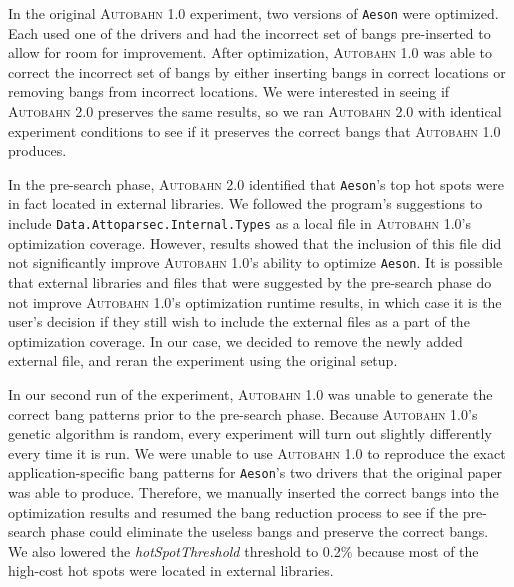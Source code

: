 \documentclass[format=sigplan, review=true]{acmart}
\newcommand{\hotspots}[0]{hot spots}
\newcommand{\hotspotcost}[0]{\textit{hotSpotThreshold}}
\newcommand{\Ao}[0]{\textsc{Autobahn 1.0}}
\newcommand{\At}[0]{\textsc{Autobahn 2.0}}
\newcommand{\preopt}[0]{pre-search}
\begin{document}
In the original \Ao{} experiment, two versions of \texttt{Aeson} were optimized. Each used one of the drivers and had the incorrect set of bangs pre-inserted to allow for room for improvement. After optimization, \Ao{} was able to correct the incorrect set of bangs by either inserting bangs in correct locations or removing bangs from incorrect locations. We were interested in seeing if \At{} preserves the same results, so we ran \At{} with identical experiment conditions to see if it preserves the correct bangs that \Ao{} produces. 

In the \preopt{} phase, \At{} identified that \texttt{Aeson}'s top hot spots were in fact located in external libraries. We followed the program's suggestions to include \texttt{Data.Attoparsec.Internal.Types} as a local file in \Ao{}'s optimization coverage. However, results showed that the inclusion of this file did not significantly improve \Ao{}'s ability to optimize \texttt{Aeson}. It is possible that external libraries and files that were suggested by the \preopt{} phase do not improve \Ao{}'s optimization runtime results, in which case it is the user's decision if they still wish to include the external files as a part of the optimization coverage. In our case, we decided to remove the newly added external file, and reran the experiment using the original setup. 




In our second run of the experiment, \Ao{} was unable to generate the correct bang patterns prior to the \preopt{} phase. Because \Ao{}'s genetic algorithm is random, every experiment will turn out slightly differently every time it is run. We were unable to use \Ao{} to reproduce the exact application-specific bang patterns for \texttt{Aeson}'s two drivers that the original paper was able to produce. Therefore, we manually inserted the correct bangs into the optimization results and resumed the bang reduction process to see if the \preopt{} phase could eliminate the useless bangs and preserve the correct bangs. We also lowered the \hotspotcost{} threshold to 0.2\% because most of the high-cost \hotspots{} were located in external libraries. 
\end{document}
